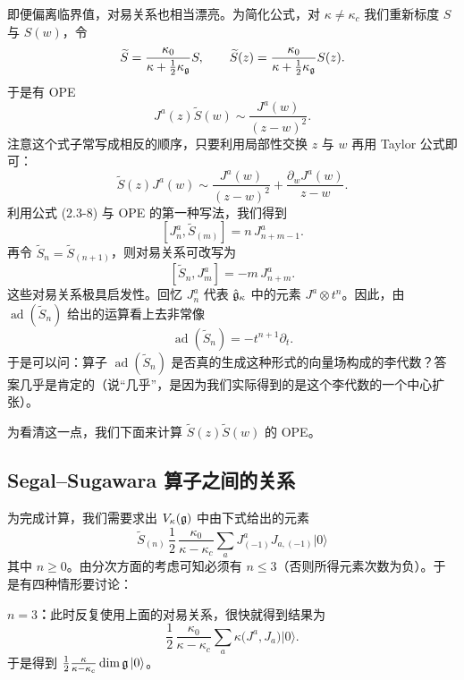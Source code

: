 即便偏离临界值，对易关系也相当漂亮。为简化公式，对 $\kappa\neq\kappa_c$ 我们重新标度 $S$ 与 $S(w)$，令
\[
    \widetilde S = \frac{\kappa_0}{\kappa+\frac12\kappa_{\mathfrak{g}}}S,
    \qquad
    \widetilde S(z) = \frac{\kappa_0}{\kappa+\frac12\kappa_{\mathfrak{g}}}S(z).
\]
于是有 OPE
\[
    J^a(z)\widetilde S(w) \sim \frac{J^a(w)}{(z-w)^2}.
\]
注意这个式子常写成相反的顺序，只要利用局部性交换 $z$ 与 $w$ 再用 Taylor 公式即可：
\begin{equation}
    \widetilde S(z)J^a(w) \sim \frac{J^a(w)}{(z-w)^2} + \frac{\partial_w J^a(w)}{z-w}.
    \tag{3.1-2}
\end{equation}
利用公式 (2.3-8) 与 OPE 的第一种写法，我们得到
\[
    [J^a_n, \widetilde S_{(m)}] = n\, J^a_{n+m-1}.
\]
再令 $\widetilde S_n=\widetilde S_{(n+1)}$，则对易关系可改写为
\[
    [\widetilde S_n, J^a_m] = -m\, J^a_{n+m}.
\]
这些对易关系极具启发性。回忆 $J^a_n$ 代表 $\hat{\mathfrak{g}}_\kappa$ 中的元素 $J^a\otimes t^n$。因此，由 $\operatorname{ad}(\widetilde S_n)$ 给出的运算看上去非常像
\[
    \operatorname{ad}(\widetilde S_n) = -t^{n+1}\partial_t .
\]
于是可以问：算子 $\operatorname{ad}(\widetilde S_n)$ 是否真的生成这种形式的向量场构成的李代数？答案几乎是肯定的（说“几乎”，是因为我们实际得到的是这个李代数的一个中心扩张）。

为看清这一点，我们下面来计算 $\widetilde S(z)\widetilde S(w)$ 的 OPE。

\subsection{Segal--Sugawara 算子之间的关系}

为完成计算，我们需要求出 $V_\kappa(\mathfrak{g})$ 中由下式给出的元素
\[
    \widetilde S_{(n)}\,\frac12\,\frac{\kappa_0}{\kappa-\kappa_c}\sum_a J^a_{(-1)}J_{a,(-1)}|0\rangle
\]
其中 $n\ge 0$。由分次方面的考虑可知必须有 $n\le 3$（否则所得元素次数为负）。于是有四种情形要讨论：

\textbf{$n=3$：}此时反复使用上面的对易关系，很快就得到结果为
\[
    \frac12\,\frac{\kappa_0}{\kappa-\kappa_c}\sum_a \kappa\bigl(J^a,J_a\bigr)|0\rangle .
\]
于是得到 $\frac12\frac{\kappa}{\kappa-\kappa_c}\dim\mathfrak{g}\,|0\rangle$。

